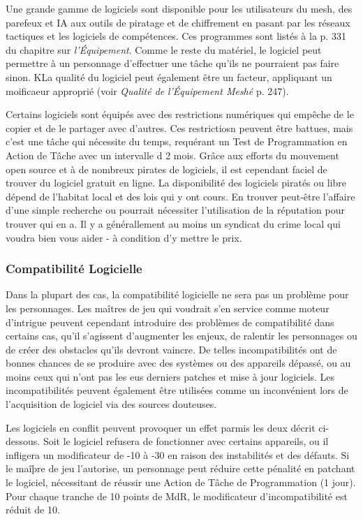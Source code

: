 Une grande gamme de logiciels sont disponible pour les utilisateurs du mesh, des parefeux et IA aux outils de piratage et de chiffrement en pasant par les réseaux tactiques et les logiciels de compétences. Ces programmes sont listés à la p. 331 du chapitre sur \textit{l'Équipement}. Comme le reste du matériel, le logiciel peut permettre à un personnage d'effectuer une tâche qu'ils ne pourraient pas faire sinon. KLa qualité du logiciel peut également être un facteur, appliquant un moificaeur approprié (voir \textit{Qualité de } \textit{l'Équipement Meshé} p. 247). 

Certains logiciels sont équipés avec des restrictions numériques qui empêche de le copier et de le partager avec d'autres. Ces restrictiosn peuvent être battues, mais c'est une tâche qui nécessite du temps, requérant un Test de Programmation en Action de Tâche avec un intervalle d 2 mois. Grâce aux efforts du mouvement open source et à de nombreux pirates de logiciels, il est cependant faciel de trouver du logiciel gratuit en ligne. La disponibilité des logiciels piratés ou libre dépend de l'habitat local et des lois qui y ont cours. En trouver peut-être l'affaire d'une simple recherche ou pourrait nécessiter l'utilisation de la réputation pour trouver qui en a. Il y a générallement au moins un syndicat du crime local qui voudra bien vous aider - à condition d'y mettre le prix. 

\subsubsection{Compatibilité Logicielle} 

Dans la plupart des cas, la compatibilité logicielle ne sera pas un problème pour les personnages. Les maîtres de jeu qui voudrait s'en service comme moteur d'intrigue peuvent cependant introduire des problèmes de compatibilité dans certains cas, qu'il s'agissent d'augmenter les enjeux, de ralentir les personnages ou de créer des obstacles qu'ils devront vaincre. De telles incompatibilités ont de bonnes chances de se produire avec des systèmes ou des appareils dépassé, ou au moins ceux qui n'ont pas les eus derniers patches et mise à jour logiciels. Les incompatibilités peuvent également être utilisées comme un inconvénient lors de l'acquisition de logiciel via des sources douteuses. 

Les logiciels en conflit peuvent provoquer un effet parmis les deux décrit ci-dessous. Soit le logiciel refusera de fonctionner avec certains appareils, ou il infligera un modificateur de -10 à -30 en raison des instabilités et des défauts. Si le maîþre de jeu l'autorise, un personnage peut réduire cette pénalité en patchant le logiciel, nécessitant de réussir une Action de Tâche de Programmation (1 jour). Pour chaque tranche de 10 points de MdR, le modificateur d'incompatibilité est réduit de 10. 

